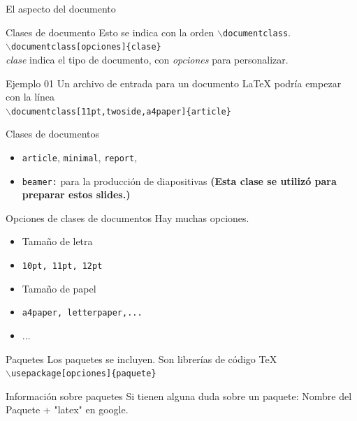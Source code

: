 \begin{frame}{El aspecto del documento}
\begin{block}{Clases de documento}
Esto se indica con la orden \texttt{$\backslash$documentclass}.\\
\texttt{$\backslash$documentclass[opciones]\{clase\}} \\
\emph{clase} indica el tipo de documento, con \emph{opciones} para personalizar.
    \end{block}

    \begin{exampleblock}{Ejemplo 01}
        Un archivo de entrada para un documento \LaTeX{} podría empezar con la l\'inea\\
        \texttt{$\backslash$documentclass[11pt,twoside,a4paper]\{article\}}
    \end{exampleblock}			
\end{frame}

\begin{frame}{Clases de documentos}
\begin{itemize}
    \item \texttt{article}, \texttt{minimal}, \texttt{report}, \pause
    \item \texttt{beamer:} para la producción de diapositivas \textbf{(Esta clase se utiliz\'o para preparar estos slides.)}
\end{itemize}
\end{frame}

\begin{frame}{Opciones de clases de documentos}
Hay muchas opciones.
\begin{itemize}
    \item Tama\~no de letra \item \texttt{10pt, 11pt, 12pt} \pause
    \item Tama\~no de papel \item \texttt{a4paper, letterpaper,...} \pause
    \item $\ldots$
\end{itemize}
\end{frame}

\begin{frame}{Paquetes}
    Los paquetes se incluyen. Son librer\'ias de c\'odigo \TeX\\
    \texttt{$\backslash$usepackage[opciones]\{paquete\}}\\

    \begin{alertblock}{Información sobre paquetes}
        Si tienen alguna duda sobre un paquete: Nombre del Paquete + "latex" en google.
    \end{alertblock}
\end{frame}

